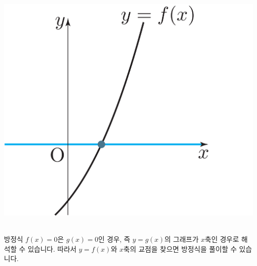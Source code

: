\begin{center} \includegraphics[scale=\pgfkeysvalueof{picsize}]{DBs/pic/zery_19.pdf}\
	\end{center}방정식 $f\left( x \right)=0 $은  $g\left( x \right)=0 $인 경우, 즉 $y=g\left( x \right) $의 그래프가 $x$축인 경우로 해석할 수 있습니다. 따라서 $y=f\left( x \right) $와 $x$축의 교점을 찾으면 방정식을 풀이할 수 있습니다.


